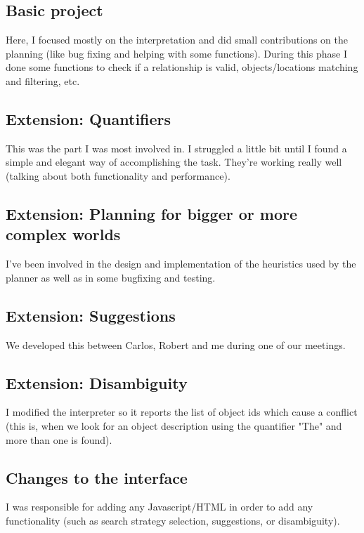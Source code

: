 \documentclass[11pt]{article}
\begin{document}
\subsection{Basic project}

Here, I focused mostly on the interpretation and did small contributions on the planning (like bug fixing and 
helping with some functions). During this phase I done some functions to check if a relationship is valid, 
objects/locations matching and filtering, etc.

\subsection{Extension: Quantifiers}

This was the part I was most involved in. I struggled a little 
bit until I found a simple and elegant way of accomplishing the task. They're working really well (talking about both functionality and performance).

\subsection{Extension: Planning for bigger or more complex worlds}

I've been involved in the design and implementation of the heuristics used by the planner as well as in some 
bugfixing and testing.

\subsection{Extension: Suggestions}

We developed this between Carlos, Robert and me during one of our meetings.

\subsection{Extension: Disambiguity}

I modified the interpreter so it reports the list of object ids which cause a conflict (this is, 
when we look for an object description using the quantifier "The" and more than one is found).

\subsection{Changes to the interface}

I was responsible for adding any Javascript/HTML in order to add any functionality (such as search strategy selection, suggestions, or disambiguity). 
\end{document}

